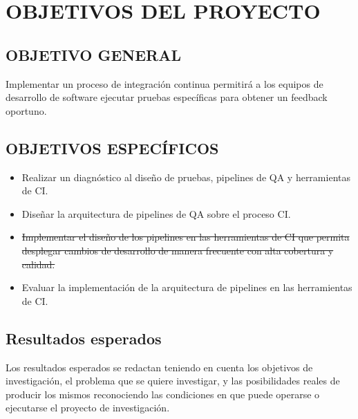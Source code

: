 \section{OBJETIVOS DEL PROYECTO }

\subsection{OBJETIVO GENERAL}
Implementar un proceso de integración continua permitirá a los equipos de desarrollo de software ejecutar pruebas específicas para obtener un feedback oportuno.

\subsection{OBJETIVOS ESPECÍFICOS}
\begin{itemize}
\item Realizar un diagnóstico al diseño de pruebas, pipelines de QA y herramientas de CI.
\item Diseñar la arquitectura de pipelines de QA sobre el proceso CI.
\item \sout{Implementar el diseño de los pipelines en las herramientas de CI que permita desplegar cambios de desarrollo de manera frecuente con alta cobertura y calidad.}
\item Evaluar la implementación de la arquitectura de pipelines en las herramientas de CI.
\end{itemize}
\subsection{Resultados esperados}
Los resultados esperados se redactan teniendo en cuenta los objetivos de investigación, el problema que se quiere investigar, y las posibilidades reales de producir los mismos reconociendo las condiciones en que puede operarse o ejecutarse el proyecto de investigación.